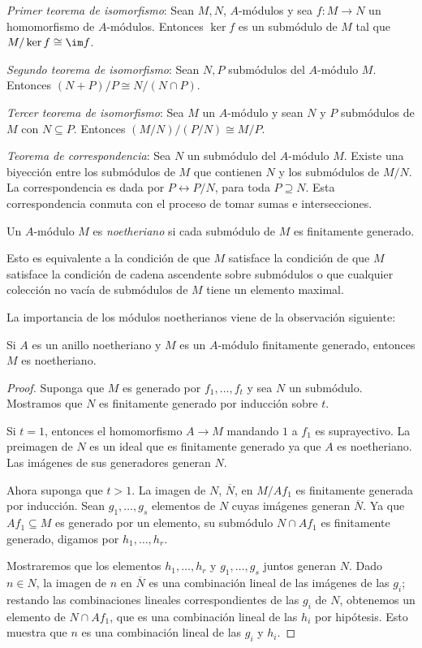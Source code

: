 \emph{Primer teorema de isomorfismo}: Sean $M,N$, $A$-módulos y sea $f\colon M \to N$ un homomorfismo de $A$-módulos. Entonces $\ker f$ es un submódulo de $M$ tal que $M/\ker f \cong \im f$.

\emph{Segundo teorema de isomorfismo}: Sean $N,P$ submódulos del $A$-módulo $M$. Entonces $(N+P)/P \cong N/(N \cap P)$.

\emph{Tercer teorema de isomorfismo}: Sea $M$ un $A$-módulo y sean $N$ y $P$ submódulos de $M$ con $N \subseteq P$. Entonces $(M/N)/(P/N) \cong M/P$.

\emph{Teorema de correspondencia}: Sea $N$ un submódulo del $A$-módulo $M$. Existe una biyección entre los submódulos de $M$ que contienen $N$ y los submódulos de $M/N$. La correspondencia es dada por $P \leftrightarrow P/N$, para toda $P \supseteq N$. Esta correspondencia conmuta con el proceso de tomar sumas e intersecciones.

\begin{definition}
  Un $A$-módulo $M$ es \emph{noetheriano} si cada submódulo de $M$ es finitamente generado.
\end{definition}

Esto es equivalente a la condición de que $M$ satisface la condición de que $M$ satisface la condición de cadena ascendente sobre submódulos o que cualquier colección no vacía de submódulos de $M$ tiene un elemento maximal.

La importancia de los módulos noetherianos viene de la observación siguiente:

\begin{theorem}
  Si $A$ es un anillo noetheriano y $M$ es un $A$-módulo finitamente generado, entonces $M$ es noetheriano.
\end{theorem}
\begin{proof}
  Suponga que $M$ es generado por $f_1, \ldots, f_t$ y sea $N$ un submódulo. Mostramos que $N$ es finitamente generado por inducción sobre $t$.

  Si $t = 1$, entonces el homomorfismo $A \to M$ mandando $1$ a $f_1$ es suprayectivo. La preimagen de $N$ es un ideal que es finitamente generado ya que $A$ es noetheriano. Las imágenes de sus generadores generan $N$.

  Ahora suponga que $t>1$. La imagen de $N$, $\overline N$, en $M/Af_1$ es finitamente generada por inducción. Sean $g_1,\ldots,g_s$ elementos de $N$ cuyas imágenes generan $\overline N$. Ya que $Af_1 \subseteq M$ es generado por un elemento, su submódulo $N \cap Af_1$ es finitamente generado, digamos por $h_1,\ldots,h_r$.

  Mostraremos que los elementos $h_1,\ldots,h_r$ y $g_1,\ldots,g_s$ juntos generan $N$. Dado $n \in N$, la imagen de $n$ en $\overline N$ es una combinación lineal de las imágenes de las $g_i$; restando las combinaciones lineales correspondientes de las $g_i$ de $N$, obtenemos un elemento de $N \cap Af_1$, que es una combinación lineal de las $h_i$ por hipótesis. Esto muestra que $n$ es una combinación lineal de las $g_i$ y $h_i$.
\end{proof}

